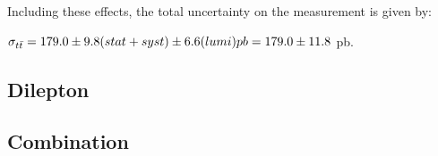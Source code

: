 Including these effects, the total uncertainty on the measurement is given by:

$\sigma_{t\bar{t}} = 179.0 \pm 9.8 (stat + syst) \pm 6.6 (lumi) pb = 179.0 \pm 11.8$ pb.




\subsection{Dilepton}


\subsection{Combination}



